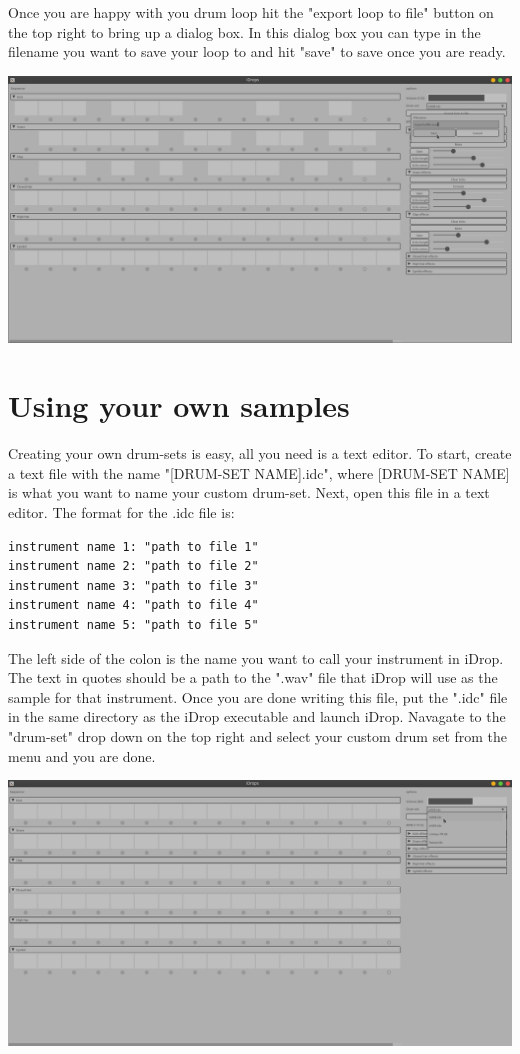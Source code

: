 \documentclass[11pt]{article}
\begin{document}
Once you are happy with you drum loop hit the "export loop to file" button
on the top right to bring up a dialog box. In this dialog box you can type in
the filename you want to save your loop to and hit "save" to save once you
are ready.

\begin{center}
\includegraphics[width=15cm]{./9.png}
\end{center}

\section{Using your own samples}
\label{sec:org962dd45}

Creating your own drum-sets is easy, all you need is a text editor. To start,
create a text file with the name "[DRUM-SET NAME].idc", where [DRUM-SET NAME]
is what you want to name your custom drum-set. Next, open this file in a text 
editor. The format for the .idc file is:

\begin{verbatim}
instrument name 1: "path to file 1" 
instrument name 2: "path to file 2" 
instrument name 3: "path to file 3"
instrument name 4: "path to file 4" 
instrument name 5: "path to file 5" 
\end{verbatim}

The left side of the colon is the name you want to call your instrument in iDrop.
The text in quotes should be a path to the ".wav" file that iDrop will use as the
sample for that instrument. Once you are done writing this file, put the ".idc" file
in the same directory as the iDrop executable and launch iDrop. Navagate to the "drum-set"
drop down on the top right and select your custom drum set from the menu and you are done.

\begin{center}
\includegraphics[width=15cm]{./10.png}
\end{center}
\end{document}
